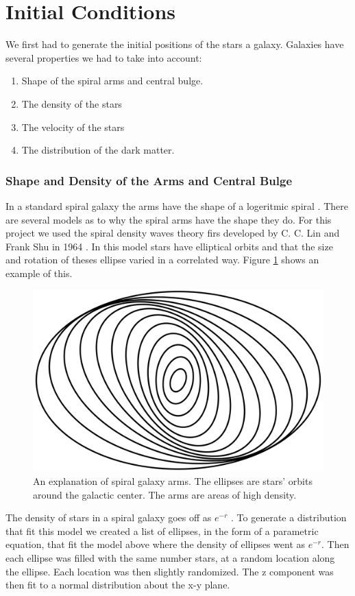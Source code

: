\documentclass{report}
\begin{document}
\section{Initial Conditions}
We first had to generate the initial positions of the stars a galaxy. Galaxies have several properties we had to take into account:
\begin{enumerate}
  \item Shape of the spiral arms and central bulge. 
  \item The density of the stars
  \item The velocity of the stars 
  \item The distribution of the dark matter. 
\end{enumerate}
\subsubsection{Shape and Density of the Arms and Central Bulge}
In a standard spiral galaxy the arms have the shape of a logeritmic spiral \cite{structure}. There are several models as to why the spiral arms have the shape they do. For this project we used the spiral density waves theory firs developed by C. C. Lin and Frank Shu in 1964 \cite{Lin}. In this model stars have elliptical orbits and that the size and rotation of theses ellipse varied in a correlated way. Figure \ref{fig:spiral-arms} shows an example of this.
\begin{figure}
\centering
\includegraphics[width=.8\columnwidth]{spiral-arms.png}
\caption{An explanation of spiral galaxy arms.  The ellipses are stars' orbits around the galactic center.  The arms are areas of high density. \label{fig:spiral-arms}}
\end{figure}

The density of stars in a spiral galaxy goes off as $e^{-r}$ \cite{structure}. To generate a distribution that fit this model we created a list of ellipses, in the form of a parametric equation, that fit the model above where the density of ellipses went as $e^{-r}$. Then each ellipse was filled with the same number stars, at a random location along the ellipse. Each location was then slightly randomized. The z component was then fit to a normal distribution about the x-y plane. 
\end{document}

